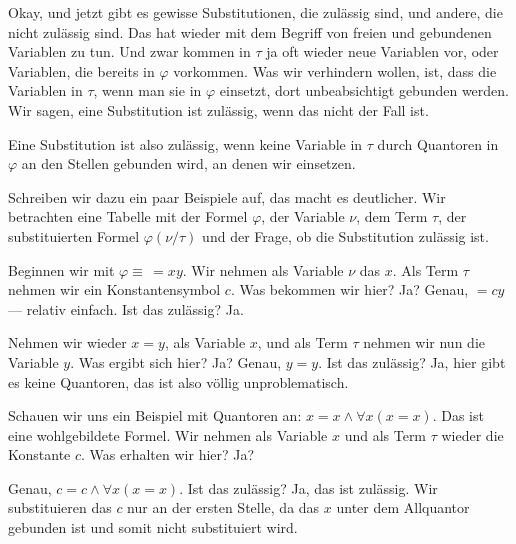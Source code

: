 \begin{ai-global-state-checkpoint-invisible-content}
\end{ai-global-state-checkpoint-invisible-content}

\begin{spoken-clean}[01:14:07 - 01:15:52]
Okay, und jetzt gibt es gewisse Substitutionen, die zulässig sind, und andere, die nicht zulässig sind. Das hat wieder mit dem Begriff von freien und gebundenen Variablen zu tun. Und zwar kommen in $\tau$ ja oft wieder neue Variablen vor, oder Variablen, die bereits in $\varphi$ vorkommen. Was wir verhindern wollen, ist, dass die Variablen in $\tau$, wenn man sie in $\varphi$ einsetzt, dort unbeabsichtigt gebunden werden. Wir sagen, eine Substitution ist zulässig, wenn das nicht der Fall ist.

Eine Substitution ist also zulässig, wenn keine Variable in $\tau$ durch Quantoren in $\varphi$ an den Stellen gebunden wird, an denen wir einsetzen.

Schreiben wir dazu ein paar Beispiele auf, das macht es deutlicher. Wir betrachten eine Tabelle mit der Formel $\varphi$, der Variable $\nu$, dem Term $\tau$, der substituierten Formel $\varphi(\nu/\tau)$ und der Frage, ob die Substitution zulässig ist.

Beginnen wir mit $\varphi \equiv \, = x y$. Wir nehmen als Variable $\nu$ das $x$. Als Term $\tau$ nehmen wir ein Konstantensymbol $c$. Was bekommen wir hier? Ja? Genau, $= c y$ --- relativ einfach. Ist das zulässig? Ja.
\end{spoken-clean}

\begin{spoken-clean}[01:15:52 - 01:17:37]
Nehmen wir wieder $x = y$, als Variable $x$, und als Term $\tau$ nehmen wir nun die Variable $y$. Was ergibt sich hier? Ja? Genau, $y = y$. Ist das zulässig? Ja, hier gibt es keine Quantoren, das ist also völlig unproblematisch.

Schauen wir uns ein Beispiel mit Quantoren an: $x = x \wedge \forall x (x = x)$. Das ist eine wohlgebildete Formel. Wir nehmen als Variable $x$ und als Term $\tau$ wieder die Konstante $c$. Was erhalten wir hier? Ja?

Genau, $c = c \wedge \forall x (x = x)$. Ist das zulässig? Ja, das ist zulässig. Wir substituieren das $c$ nur an der ersten Stelle, da das $x$ unter dem Allquantor gebunden ist und somit nicht substituiert wird.
\end{spoken-clean}

